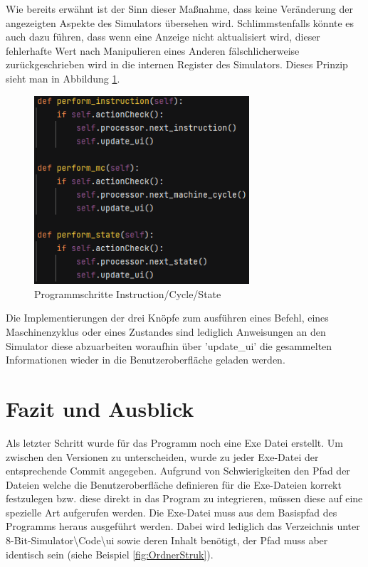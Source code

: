 \documentclass[12pt]{article}
\newcommand{\imgSpaceBefore}{\vspace{10pt}}
\begin{document}
\noindent
Wie bereits erwähnt ist der Sinn dieser Maßnahme, dass keine Veränderung der angezeigten Aspekte des Simulators übersehen wird. Schlimmstenfalls könnte es auch dazu führen, dass wenn eine Anzeige nicht aktualisiert wird, dieser fehlerhafte Wert nach Manipulieren eines Anderen fälschlicherweise zurückgeschrieben wird in die internen Register des Simulators. Dieses Prinzip sieht man in Abbildung \ref{fig:perf}.\imgSpaceBefore

\begin{figure}[H]
\centering
\includegraphics[width=8cm]{bilder/Perform}
\caption{Programmschritte Instruction/Cycle/State}
\label{fig:perf}
\end{figure}

\noindent
Die Implementierungen der drei Knöpfe zum ausführen eines Befehl, eines Maschinenzyklus oder eines Zustandes sind lediglich Anweisungen an den Simulator diese abzuarbeiten woraufhin über 'update\_ui' die gesammelten Informationen wieder in die Benutzeroberfläche geladen werden.

\newpage

\section{Fazit und Ausblick}
Als letzter Schritt wurde für das Programm noch eine Exe Datei erstellt. Um zwischen den Versionen zu unterscheiden, wurde zu jeder Exe-Datei der entsprechende Commit angegeben. Aufgrund von Schwierigkeiten den Pfad der Dateien welche die Benutzeroberfläche definieren für die Exe-Dateien korrekt festzulegen bzw. diese direkt in das Program zu integrieren, müssen diese auf eine spezielle Art aufgerufen werden. Die Exe-Datei muss aus dem Basispfad des Programms heraus ausgeführt werden. Dabei wird lediglich das Verzeichnis unter 8-Bit-Simulator\textbackslash Code\textbackslash ui sowie deren Inhalt benötigt, der Pfad muss aber identisch sein (siehe Beispiel \ref{fig:OrdnerStruk}).\imgSpaceBefore
\end{document}
